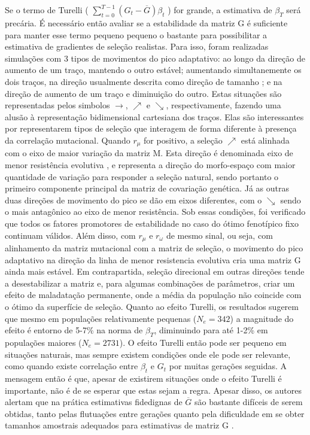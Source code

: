 \documentclass[a4paper, 12pt, titlepage, onecolumn]{article}
\numberwithin{equation}{section}
\numberwithin{table}{section}
\begin{document}
Se o termo de Turelli (  $\sum_{t=0}^{T-1} (G_t - \overline {G})
\beta_t$ ) for grande, a estimativa de $\beta_T$ será precária. É
necessário então avaliar se a estabilidade da matriz G é suficiente para
manter esse termo pequeno pequeno o bastante para possibilitar a
estimativa de gradientes de seleção realistas. Para isso, foram
realizadas simulações com 3 tipos de movimentos do pico adaptativo: ao
longo da direção de aumento de um traço, mantendo o outro estável;
aumentando simultanemente os dois traços, na direção usualmente descrita
como direção de tamanho \citep{Marroig2005}; e na direção de aumento de
um traço e diminuição do outro. Estas situações são representadas pelos
simbolos $\rightarrow$, $\nearrow$ e $\searrow$, respectivamente,
fazendo uma alusão à representação bidimensional cartesiana dos traços.
Elas são interessantes por representarem tipos de seleção que interagem
de forma diferente à presença da correlação mutacional. Quando $r_\mu$
for positivo, a seleção $\nearrow$ está alinhada com o eixo de maior
variação da matriz M. Esta direção é denominada eixo de menor
resistência evolutiva \citep{Schluter1996}, e  representa a direção do
morfo-espaço com maior quantidade de variação para responder a seleção
natural, sendo portanto o primeiro componente principal da matriz de
covariação genética.  Já as outras duas direções de movimento do pico se
dão em eixos diferentes, com o $\searrow$ sendo o mais antagônico ao
eixo de menor resistência. Sob essas condições, foi verificado que todos
os fatores promotores de estabilidade no caso do ótimo fenotípico fixo
continuam válidos.  Além disso, com $r_\mu$ e $r_\omega$ de mesmo sinal,
ou seja, com alinhamento da matriz mutacional com a matriz de seleção, o
movimento do pico adaptativo na direção da linha de menor resistencia
evolutiva cria uma matriz G ainda mais estável. Em contrapartida,
seleção direcional em outras direções tende a desestabilizar a matriz e,
para algumas combinações de parâmetros, criar um efeito de maladatação
permanente, onde a média da população não coincide com o ótimo da
superfície de seleção. Quanto ao efeito Turelli, os resultados sugerem
que mesmo em populações relativamente pequenas ($N_e=342$) a magnitude
do efeito é entorno de 5-7\% na norma de $\beta_T$, diminuindo para até
1-2\% em populações maiores ($N_e=2731$). O efeito Turelli então pode
ser pequeno em situações naturais, mas sempre existem condições onde ele
pode ser relevante, como quando existe correlação entre $\beta_t$ e
$G_t$ por muitas gerações seguidas. A mensagem então é que, apesar de
existirem situações onde o efeito Turelli é importante, não é de se
esperar que estas sejam a regra. Apesar disso, os autores alertam que na
prática estimativas fidedignas de $\overline {G}$ são bastante difíceis
de serem obtidas, tanto pelas flutuações entre gerações quanto pela
dificuldade em se obter tamanhos amostrais adequados para estimativas de
matriz G \citep{Marroig2011b}.
\end{document}
